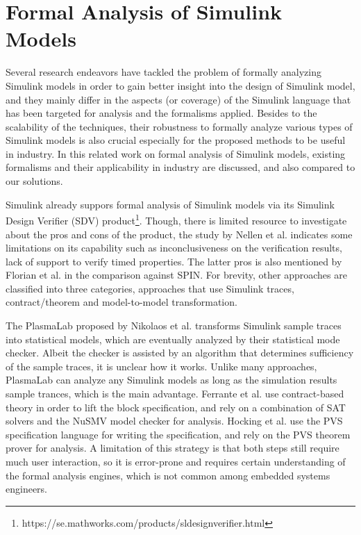 \section{Formal Analysis of Simulink Models}
Several research endeavors have tackled the problem of formally analyzing Simulink models in order to gain better insight into the design of Simulink model, and they mainly differ in the aspects (or coverage) of the Simulink language that has been targeted for analysis and the formalisms applied. Besides to the scalability of the techniques, their robustness to formally analyze various types of Simulink models is also crucial especially for the proposed methods to be useful in industry. In this related work on formal analysis of Simulink models, existing formalisms and their applicability in industry are discussed, and also compared to our solutions.

Simulink already suppors formal analysis of Simulink models via its Simulink Design Verifier (SDV) product\footnote{https://se.mathworks.com/products/sldesignverifier.html}. Though, there is limited resource to investigate about the pros and cons of the product, the study by Nellen et al. \cite{Nellen2018FormalRecommendations} indicates some limitations on its capability such as inconclusiveness on the verification results, lack of support to verify timed properties. The latter pros is also mentioned by Florian et al. \cite{Leitner2008SimulinkStudy} in the comparison against SPIN. For brevity, other approaches are classified into three categories, approaches that use Simulink traces, contract/theorem and model-to-model transformation. 

The PlasmaLab proposed by Nikolaos et al. \cite{Kekatos2018ConstructingHybridization} transforms Simulink sample traces into statistical models, which are eventually analyzed by their statistical mode checker. Albeit the checker is assisted by an algorithm that determines sufficiency of the sample traces, it is unclear how it works. Unlike many approaches, PlasmaLab can analyze any Simulink models as long as the simulation results sample trances, which is the main advantage. Ferrante et al. \cite{Hocking2016ProvingModels} use contract-based theory in order to lift the block specification, and rely on a combination of SAT solvers and the NuSMV model checker for analysis. Hocking et al. \cite{Ferrante2012ParallelSystems} use the PVS specification language for writing the specification, and rely on the PVS theorem prover for analysis. A limitation of this strategy is that both steps still require much user interaction, so it is error-prone and requires certain understanding of the formal analysis engines, which is not common among embedded systems engineers.

